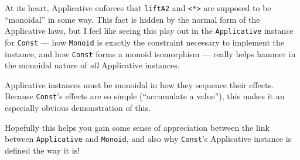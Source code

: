 \documentclass[]{article}
\begin{document}
At its heart, Applicative enforces that \texttt{liftA2} and
\texttt{\textless{}*\textgreater{}} are supposed to be ``monoidal'' in some way.
This fact is hidden by the normal form of the Applicative laws, but I feel like
seeing this play out in the \texttt{Applicative} instance for \texttt{Const} ---
how \texttt{Monoid} is exactly the constraint necessary to implement the
instance, and how \texttt{Const} forms a monoid isomorphism --- really helps
hammer in the monoidal nature of \emph{all} Applicative instances.

Applicative instances must be monoidal in how they sequence their effects.
Because \texttt{Const}'s effects are so simple (``accumulate a value''), this
makes it an especially obvious demonstration of this.

Hopefully this helps you gain some sense of appreciation between the link
between \texttt{Applicative} and \texttt{Monoid}, and also why \texttt{Const}'s
Applicative instance is defined the way it is!
\end{document}

